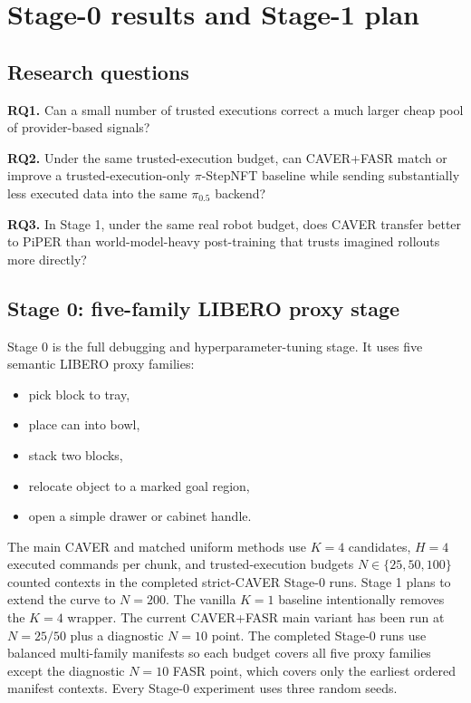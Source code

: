 \documentclass[10pt]{article}
\theoremstyle{plain}
\theoremstyle{definition}
\theoremstyle{remark}
\begin{document}
\section{Stage-0 results and Stage-1 plan}
\subsection{Research questions}
\textbf{RQ1.} Can a small number of trusted executions correct a much larger cheap pool of provider-based signals?

\textbf{RQ2.} Under the same trusted-execution budget, can CAVER+FASR match or improve a trusted-execution-only $\pi$-StepNFT baseline while sending substantially less executed data into the same $\pi_{0.5}$ backend?

\textbf{RQ3.} In Stage 1, under the same real robot budget, does CAVER transfer better to PiPER than world-model-heavy post-training that trusts imagined rollouts more directly?

\subsection{Stage 0: five-family LIBERO proxy stage}
Stage 0 is the full debugging and hyperparameter-tuning stage. It uses five semantic LIBERO proxy families:
\begin{itemize}
    \item pick block to tray,
    \item place can into bowl,
    \item stack two blocks,
    \item relocate object to a marked goal region,
    \item open a simple drawer or cabinet handle.
\end{itemize}
The main CAVER and matched uniform methods use $K=4$ candidates, $H=4$ executed commands per chunk, and trusted-execution budgets $N\in\{25,50,100\}$ counted contexts in the completed strict-CAVER Stage-0 runs. Stage 1 plans to extend the curve to $N=200$. The vanilla $K=1$ baseline intentionally removes the $K=4$ wrapper. The current CAVER+FASR main variant has been run at $N=25/50$ plus a diagnostic $N=10$ point. The completed Stage-0 runs use balanced multi-family manifests so each budget covers all five proxy families except the diagnostic $N=10$ FASR point, which covers only the earliest ordered manifest contexts. Every Stage-0 experiment uses three random seeds.
\end{document}
